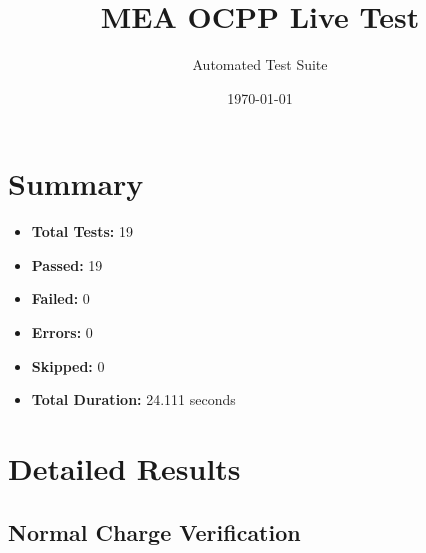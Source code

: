 \documentclass{article}
\title{MEA OCPP Live Test}
\author{Automated Test Suite}
\date{\today}
\begin{document}
\maketitle

\section{Summary}
\begin{itemize}
    \item \textbf{Total Tests:} 19
    \item \textbf{Passed:} 19
    \item \textbf{Failed:} 0
    \item \textbf{Errors:} 0
    \item \textbf{Skipped:} 0
    \item \textbf{Total Duration:} 24.111 seconds
\end{itemize}

\section{Detailed Results}
\subsection{Normal Charge Verification}
\end{document}
